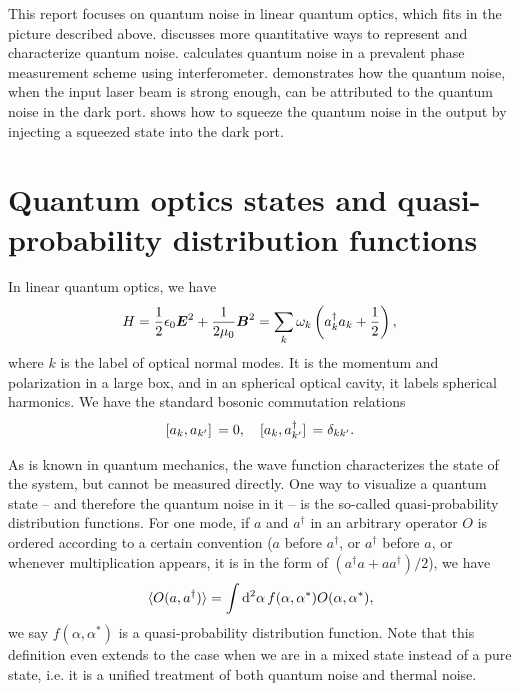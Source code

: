 \documentclass[hyperref, a4paper]{article}
\begin{document}
This report focuses on quantum noise in linear quantum optics,
which fits in the picture described above.
 discusses more quantitative ways to represent and characterize quantum noise.
 calculates quantum noise 
in a prevalent phase measurement scheme using interferometer.
 demonstrates how the quantum noise, 
when the input laser beam is strong enough,
can be attributed to the quantum noise in the dark port.
 shows how to squeeze the quantum noise in the output 
by injecting a squeezed state into the dark port.

\section{Quantum optics states and quasi-probability distribution functions}\label{sec:overview-rep}



In linear quantum optics, we have 
\begin{equation}
    H = \frac{1}{2} \epsilon_0 \vb*{E}^2 + \frac{1}{2 \mu_0} \vb*{B}^2
    = \sum_{k} \omega_k \left( a^\dagger_k a_k + \frac{1}{2} \right),
\end{equation}
where $k$ is the label of optical normal modes.
It is the momentum and polarization in a large box, 
and in an spherical optical cavity, it labels spherical harmonics.
We have the standard bosonic commutation relations 
\begin{equation}
    \comm*{a_k}{a_{k'}} = 0, \quad \comm*{a_k}{a^\dagger_{k'}} = \delta_{k k'}.
\end{equation}

As is known in quantum mechanics,
the wave function characterizes the state of the system,
but cannot be measured directly.
One way to visualize a quantum state -- and therefore the quantum noise in it --
is the so-called quasi-probability distribution functions.
For one mode, if $a$ and $a^\dagger$ in an arbitrary operator $O$ is ordered according to a certain convention
($a$ before $a^\dagger$, or $a^\dagger$ before $a$, 
or whenever multiplication appears, it is in the form of $(a^\dagger a + a a^\dagger) / 2$), 
we have 
\begin{equation}
    \expval*{O(a, a^\dagger)} = \int \dd[2]{\alpha} f(\alpha, \alpha^*) O(\alpha, \alpha^*),
\end{equation}
we say $f(\alpha, \alpha^*)$ is a quasi-probability distribution function.
Note that this definition even extends to the case 
when we are in a mixed state instead of a pure state, 
i.e. it is a unified treatment of both quantum noise and thermal noise.
\end{document}
